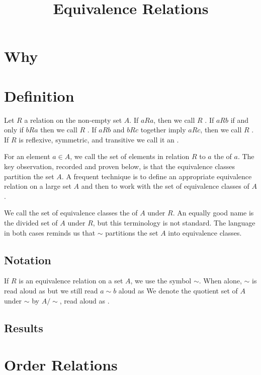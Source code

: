 





\title{Equivalence Relations}

\section{Why}


\section{Definition}

Let $R$ a relation on the non-empty set $A$.
If $aRa$, then we call $R$ .
If $aRb$ if and only if $bRa$ then we call $R$ .
If $aRb$ and $bRc$ together imply $aRc$, then we call $R$ .
If $R$ is reflexive, symmetric, and transitive we call it an .

For an element $a \in A$, we call the set of elements in relation $R$ to $a$ the  of $a$.
The key observation, recorded and proven below, is that the equivalence classes partition the set $A$.
A frequent technique is to define an appropriate equivalence relation on a large set $A$ and then to work with the set of equivalence classes of $A$.

We call the set of equivalence classes the  of $A$ under $R$.
An equally good name is the divided set of $A$ under $R$, but this terminology is not standard.
The language in both cases reminds us that $\sim$ partitions the set $A$ into equivalence classes.

\subsection{Notation}
If $R$ is an equivalence relation on a set $A$, we use the symbol $\sim$.
When alone, $\sim$ is read aloud as  but we still read $a \sim b$ aloud as 
We denote the quotient set of  $A$ under $\sim$ by $A/\sim$, read aloud as .

\subsection{Results}

\section{Order Relations}

